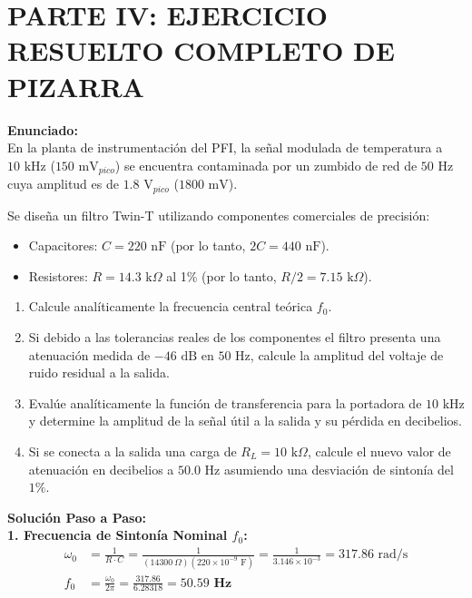 \documentclass[11pt,a4paper,twoside]{article}
\begin{document}
\newpage
\section{PARTE IV: EJERCICIO RESUELTO COMPLETO DE PIZARRA}
\textbf{Enunciado:}\\
En la planta de instrumentación del PFI, la señal modulada de temperatura a $10\text{ kHz}$ ($150\text{ mV}_{pico}$) se encuentra contaminada por un zumbido de red de $50\text{ Hz}$ cuya amplitud es de $1.8\text{ V}_{pico}$ ($1800\text{ mV}$). 

Se diseña un filtro Twin-T utilizando componentes comerciales de precisión:
\begin{itemize}
    \item Capacitores: $C = 220\text{ nF}$ (por lo tanto, $2C = 440\text{ nF}$).
    \item Resistores: $R = 14.3\text{ k}\Omega$ al 1\% (por lo tanto, $R/2 = 7.15\text{ k}\Omega$).
\end{itemize}

\begin{enumerate}
    \item Calcule analíticamente la frecuencia central teórica $f_0$.
    \item Si debido a las tolerancias reales de los componentes el filtro presenta una atenuación medida de $-46\text{ dB}$ en $50\text{ Hz}$, calcule la amplitud del voltaje de ruido residual a la salida.
    \item Evalúe analíticamente la función de transferencia para la portadora de $10\text{ kHz}$ y determine la amplitud de la señal útil a la salida y su pérdida en decibelios.
    \item Si se conecta a la salida una carga de $R_L = 10\text{ k}\Omega$, calcule el nuevo valor de atenuación en decibelios a $50.0\text{ Hz}$ asumiendo una desviación de sintonía del $1\%$.
\end{enumerate}

\textbf{Solución Paso a Paso:}
\vspace{0.3cm}\\
\textbf{1. Frecuencia de Sintonía Nominal $f_0$:}
\begin{align*}
    \omega_0 &= \frac{1}{R \cdot C} = \frac{1}{(14300\ \Omega)(220 \times 10^{-9}\text{ F})} = \frac{1}{3.146 \times 10^{-3}} = 317.86\text{ rad/s} \\
    f_0 &= \frac{\omega_0}{2\pi} = \frac{317.86}{6.28318} = \mathbf{50.59\text{ Hz}}
\end{align*}
\end{document}
